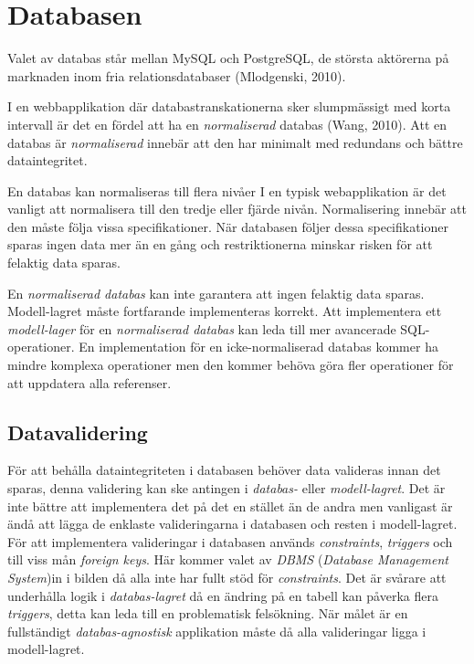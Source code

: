 \section{Databasen}\label{sec:databasen}

Valet av databas står mellan MySQL och PostgreSQL, de största aktörerna på marknaden inom fria relationsdatabaser (Mlodgenski, 2010).

I en webbapplikation där databastranskationerna sker slumpmässigt 
med korta intervall är det en fördel att ha en \emph{normaliserad} databas (Wang, 2010). 
Att en databas är \emph{normaliserad} innebär att den har minimalt med redundans och bättre dataintegritet.

En databas kan normaliseras till flera nivåer I en typisk webapplikation är det vanligt att
normalisera till den tredje eller fjärde nivån. 
Normalisering innebär att den måste följa vissa specifikationer. 
När databasen följer dessa specifikationer sparas ingen data mer än en gång 
och restriktionerna minskar risken för att  felaktig data sparas.

En \emph{normaliserad databas} kan inte garantera att ingen felaktig data sparas. Modell-lagret måste fortfarande implementeras korrekt. Att implementera ett \emph{modell-lager} för en \emph{normaliserad databas} kan leda till mer avancerade SQL-operationer. En implementation för en icke-normaliserad databas kommer ha mindre komplexa operationer men den kommer behöva göra fler operationer för att uppdatera alla referenser.

\subsection{Datavalidering}
För att behålla dataintegriteten i databasen behöver data valideras innan det sparas, denna validering kan ske antingen i \emph{databas-} eller \emph{modell-lagret}.
Det är inte bättre att implementera det på det en stället än de andra men vanligast är ändå att lägga de enklaste valideringarna i databasen och resten i modell-lagret. För att implementera valideringar i databasen används \emph{constraints}, \emph{triggers} och till viss mån \emph{foreign keys}. Här kommer valet av \emph{DBMS} (\emph{Database Management System})in i bilden då alla inte har fullt stöd för \emph{constraints}.
Det är svårare att underhålla logik i \emph{databas-lagret} då en ändring på en tabell kan påverka flera \emph{triggers}, detta kan leda till en problematisk felsökning.
När målet är en fullständigt \emph{databas-agnostisk} applikation måste då alla valideringar ligga i modell-lagret. 

